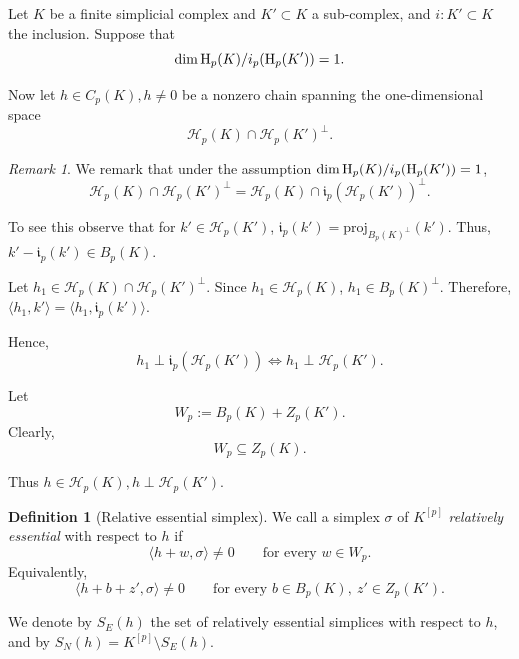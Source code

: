 \documentclass[11pt]{amsart}
\theoremstyle{theorem}
\theoremstyle{remark}
\newtheorem{remark}{Remark}[section]
\theoremstyle{definition}
\newtheorem{definition}{Definition}[section]
\newcommand{\Harm}{\mathcal{H}}
\newcommand {\la}   {{\langle}}
\newcommand {\ra}   {{\rangle}}
\newcommand{\HH}  {\mbox{\rm H}}
\begin{document}


Let $K$ be a finite simplicial complex and $K' \subset K$ a sub-complex,
and $i:K' \subset K$ the inclusion. Suppose that
\begin{equation}
\label{eqn:two-step}
\dim \HH_p(K)/ i_p(\HH_p(K')) = 1.
\end{equation}

Now let \(h\in C_p(K), h \neq 0\) be a nonzero chain spanning the one-dimensional space
\[
\Harm_p(K)\cap \Harm_p(K')^\perp.
\]

\begin{remark}
\label{rem:K'}
We remark that under the assumption $\dim \HH_p(K)/ i_p(\HH_p(K')) = 1$,
\begin{equation}
\label{eqn:rem:K'}
\Harm_p(K)\cap \Harm_p(K')^\perp = \Harm_p(K)\cap \mathfrak{i}_p(\Harm_p(K'))^\perp.
\end{equation}

To see this observe that for $k' \in \Harm_p(K')$, $\mathfrak{i}_p(k') = \mathrm{proj}_{B_p(K)^\perp}(k')$. Thus, $k' - \mathfrak{i}_p(k') \in B_p(K)$.

Let $h_1 \in \Harm_p(K)\cap \Harm_p(K')^\perp$.
Since $h_1 \in \Harm_p(K)$, $h_1 \in B_p(K)^\perp$.
Therefore, $\la h_1, k'\ra = \la h_1, \mathfrak{i}_p(k') \ra$.

Hence,
\[
h_1 \perp \mathfrak{i}_p(\Harm_p(K')) \Leftrightarrow h_1 \perp \Harm_p(K').
\]
\end{remark}

Let
\begin{equation}
\label{eqn:W}
W_p:=B_p(K)+Z_p(K').
\end{equation}
Clearly,
\[
W_p \subseteq Z_p(K).
\]




Thus
$
h\in\Harm_p(K),
h\perp \Harm_p(K')
$.

\begin{definition}[Relative essential simplex]
\label{def:relative-essential}
We call a simplex \(\sigma\) of \(K^{[p]}\) \emph{relatively essential}
with respect to \(h\) if
\[
\langle h+w,\sigma\rangle\neq 0
\qquad
\text{for every }w\in W_p.
\]
Equivalently,
\[
\langle h+b+z',\sigma\rangle\neq 0
\qquad
\text{for every }b\in B_p(K),\ z'\in Z_p(K').
\]

We denote by  \(S_E(h)\)  the set of relatively essential simplices with respect to $h$, and by
\(S_N(h) = K^{[p]} \setminus S_E(h)\). 
\end{definition}
\end{document}
